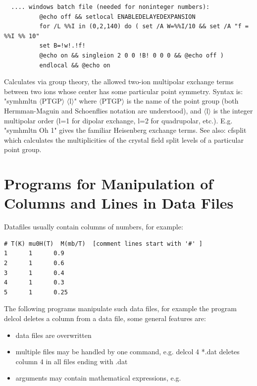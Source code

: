 \begin{description}
\begin{verbatim}
  .... windows batch file (needed for noninteger numbers):
          @echo off && setlocal ENABLEDELAYEDEXPANSION
          for /L %%I in (0,2,140) do ( set /A W=%%I/10 && set /A "f = %%I %% 10"
          set B=!w!.!f!
          @echo on && singleion 2 0 0 !B! 0 0 0 && @echo off )
          endlocal && @echo on 

\end{verbatim}      

\item [\prg symhmltn:] Calculates via group theory, the allowed two-ion multipolar exchange terms
between two ions whose center has some particular point symmetry. Syntax is: 
"{\prg symhmltn $\langle$PTGP$\rangle$ $\langle$l$\rangle$}" where {\prg $\langle$PTGP$\rangle$} is 
the name of the point group (both Hermman-Maguin and Schoenflies notation are understood), and 
{\prg $\langle$l$\rangle$} is the integer multipolar order (l=1 for dipolar exchange, l=2 for 
quadrupolar, etc.).
E.g. "{\prg symhmltn Oh 1}" gives the familiar Heisenberg exchange terms. 
See also: {\prg cfsplit} which calculates the multiplicities of the crystal field split levels of a
particular point group.

\end{description} 

\section{Programs for Manipulation of Columns and Lines in Data Files}

Datafiles usually contain columns of numbers, for example:

\begin{verbatim}
# T(K) mu0H(T)  M(mb/T)  [comment lines start with '#' ]
1      1      0.9
2      1      0.6
3      1      0.4
4      1      0.3
5      1      0.25
\end{verbatim}

The following programs manipulate such data files, for example
the program {\prg delcol} deletes a column from a data file,
some general features are:
\begin{itemize}
\item data files are overwritten 
\item multiple files may be handled by one command, e.g. {\prg delcol 4 *.dat} deletes column 4
in all 
files ending with .dat
\item arguments may contain mathematical expressions, e.g. 
\end{itemize}

